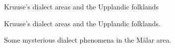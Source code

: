  


\begin{figure}[h]
\caption{Kruuse’s dialect areas and the Upplandic folklands}
\label{map:6:33}
\end{figure}


\begin{figure}[h]
\caption{Kruuse’s dialect areas and the Upplandic folklands.}
\label{map:6:40}
\end{figure}


 
\begin{figure}[h]
\caption{Some mysterious dialect phenomena in the Mälar area.}
\label{map:6:41}
\end{figure}

 